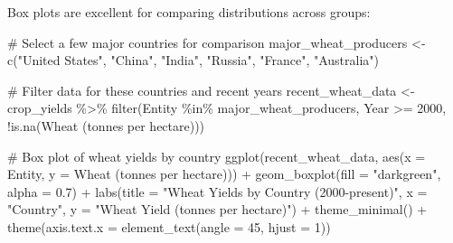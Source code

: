 \documentclass[
  letterpaper,
]{book}
\newenvironment{Shaded}{\begin{snugshade}}{\end{snugshade}}
\newcommand{\AttributeTok}[1]{\textcolor[rgb]{0.40,0.45,0.13}{#1}}
\newcommand{\CommentTok}[1]{\textcolor[rgb]{0.37,0.37,0.37}{#1}}
\newcommand{\DecValTok}[1]{\textcolor[rgb]{0.68,0.00,0.00}{#1}}
\newcommand{\FloatTok}[1]{\textcolor[rgb]{0.68,0.00,0.00}{#1}}
\newcommand{\FunctionTok}[1]{\textcolor[rgb]{0.28,0.35,0.67}{#1}}
\newcommand{\NormalTok}[1]{\textcolor[rgb]{0.00,0.23,0.31}{#1}}
\newcommand{\OtherTok}[1]{\textcolor[rgb]{0.00,0.23,0.31}{#1}}
\newcommand{\SpecialCharTok}[1]{\textcolor[rgb]{0.37,0.37,0.37}{#1}}
\newcommand{\StringTok}[1]{\textcolor[rgb]{0.13,0.47,0.30}{#1}}
\begin{document}
Box plots are excellent for comparing distributions across groups:

\begin{Shaded}
\begin{Highlighting}[]
\CommentTok{\# Select a few major countries for comparison}
\NormalTok{major\_wheat\_producers }\OtherTok{\textless{}{-}} \FunctionTok{c}\NormalTok{(}\StringTok{"United States"}\NormalTok{, }\StringTok{"China"}\NormalTok{, }\StringTok{"India"}\NormalTok{, }\StringTok{"Russia"}\NormalTok{, }\StringTok{"France"}\NormalTok{, }\StringTok{"Australia"}\NormalTok{)}

\CommentTok{\# Filter data for these countries and recent years}
\NormalTok{recent\_wheat\_data }\OtherTok{\textless{}{-}}\NormalTok{ crop\_yields }\SpecialCharTok{\%\textgreater{}\%}
  \FunctionTok{filter}\NormalTok{(Entity }\SpecialCharTok{\%in\%}\NormalTok{ major\_wheat\_producers, }
\NormalTok{         Year }\SpecialCharTok{\textgreater{}=} \DecValTok{2000}\NormalTok{,}
         \SpecialCharTok{!}\FunctionTok{is.na}\NormalTok{(}\StringTok{\textasciigrave{}}\AttributeTok{Wheat (tonnes per hectare)}\StringTok{\textasciigrave{}}\NormalTok{))}

\CommentTok{\# Box plot of wheat yields by country}
\FunctionTok{ggplot}\NormalTok{(recent\_wheat\_data, }\FunctionTok{aes}\NormalTok{(}\AttributeTok{x =}\NormalTok{ Entity, }\AttributeTok{y =} \StringTok{\textasciigrave{}}\AttributeTok{Wheat (tonnes per hectare)}\StringTok{\textasciigrave{}}\NormalTok{)) }\SpecialCharTok{+}
  \FunctionTok{geom\_boxplot}\NormalTok{(}\AttributeTok{fill =} \StringTok{"darkgreen"}\NormalTok{, }\AttributeTok{alpha =} \FloatTok{0.7}\NormalTok{) }\SpecialCharTok{+}
  \FunctionTok{labs}\NormalTok{(}\AttributeTok{title =} \StringTok{"Wheat Yields by Country (2000{-}present)"}\NormalTok{, }
       \AttributeTok{x =} \StringTok{"Country"}\NormalTok{, }
       \AttributeTok{y =} \StringTok{"Wheat Yield (tonnes per hectare)"}\NormalTok{) }\SpecialCharTok{+}
  \FunctionTok{theme\_minimal}\NormalTok{() }\SpecialCharTok{+}
  \FunctionTok{theme}\NormalTok{(}\AttributeTok{axis.text.x =} \FunctionTok{element\_text}\NormalTok{(}\AttributeTok{angle =} \DecValTok{45}\NormalTok{, }\AttributeTok{hjust =} \DecValTok{1}\NormalTok{))}
\end{Highlighting}
\end{Shaded}
\end{document}
